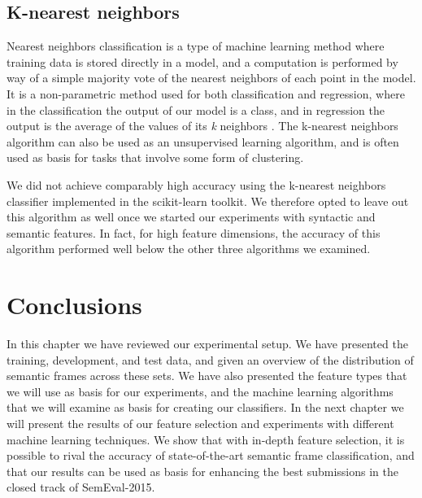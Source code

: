 \subsection{K-nearest neighbors}

Nearest neighbors classification is a type of machine learning method where training data is stored directly in a model, and a computation is performed by way of a simple majority vote of the nearest neighbors of each point in the model. It is a non-parametric method used for both classification and regression, where in the classification the output of our model is a class, and in regression the output is the average of the values of its \textit{k} neighbors \cite{Altman:92}. The k-nearest neighbors algorithm can also be used as an unsupervised learning algorithm, and is often used as basis for tasks that involve some form of clustering.

We did not achieve comparably high accuracy using the k-nearest neighbors classifier implemented in the scikit-learn toolkit. We therefore opted to leave out this algorithm as well once we started our experiments with syntactic and semantic features. In fact, for high feature dimensions, the accuracy of this algorithm performed well below the other three algorithms we examined.

\section{Conclusions}

In this chapter we have reviewed our experimental setup. We have presented the training, development, and test data, and given an overview of the distribution of semantic frames across these sets. We have also presented the feature types that we will use as basis for our experiments, and the machine learning algorithms that we will examine as basis for creating our classifiers. In the next chapter we will present the results of our feature selection and experiments with different machine learning techniques. We show that with in-depth feature selection, it is possible to rival the accuracy of state-of-the-art semantic frame classification, and that our results can be used as basis for enhancing the best submissions in the closed track of SemEval-2015.